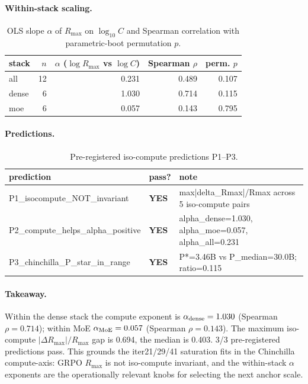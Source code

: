 \documentclass{article}
\begin{document}
\paragraph{Within-stack scaling.}
\begin{table}[ht]
\centering\small
\begin{tabular}{lrrrr}
\toprule
stack & $n$ & $\alpha$ ($\log R_{\max}$ vs $\log C$) & Spearman $\rho$ & perm. $p$ \\
\midrule
 all & 12 & 0.231 & 0.489 & 0.107 \\
 dense & 6 & 1.030 & 0.714 & 0.115 \\
 moe & 6 & 0.057 & 0.143 & 0.795 \\
\bottomrule
\end{tabular}
\caption{OLS slope $\alpha$ of $R_{\max}$ on $\log_{10}C$ and Spearman correlation with parametric-boot permutation $p$.}
\end{table}
\paragraph{Predictions.}
\begin{table}[ht]
\centering\small
\begin{tabular}{lll}
\toprule
prediction & pass? & note \\
\midrule
 P1_isocompute_NOT_invariant & \textbf{YES} & max|delta_Rmax|/Rmax across 5 iso-compute pairs \\
 P2_compute_helps_alpha_positive & \textbf{YES} & alpha_dense=1.030, alpha_moe=0.057, alpha_all=0.231 \\
 P3_chinchilla_P_star_in_range & \textbf{YES} & P*=3.46B vs P_median=30.0B; ratio=0.115 \\
\bottomrule
\end{tabular}
\caption{Pre-registered iso-compute predictions P1--P3.}
\end{table}
\paragraph{Takeaway.}
 Within the dense stack the compute exponent is $\alpha_{\rm dense}=1.030$ (Spearman $\rho=0.714$); within MoE $\alpha_{\rm MoE}=0.057$ (Spearman $\rho=0.143$). The maximum iso-compute $|\Delta R_{\max}|/R_{\max}$ gap is 0.694, the median is 0.403. 3/3 pre-registered predictions pass. This grounds the iter21/29/41 saturation fits in the Chinchilla compute-axis: GRPO $R_{\max}$ is not iso-compute invariant, and the within-stack $\alpha$ exponents are the operationally relevant knobs for selecting the next anchor scale.
\end{document}
